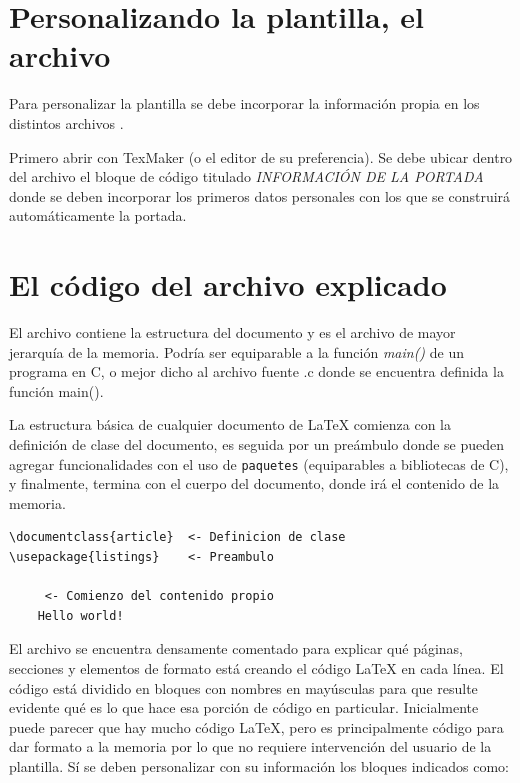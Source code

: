 \section{Personalizando la plantilla, el archivo }
\label{sec:FillingFile}

Para personalizar la plantilla se debe incorporar la información propia en los distintos archivos . 

Primero abrir  con TexMaker (o el editor de su preferencia). Se debe ubicar dentro del archivo el bloque de código titulado \emph{INFORMACIÓN DE LA PORTADA} donde se deben incorporar los primeros datos personales con los que se construirá automáticamente la portada.



\section{El código del archivo  explicado}

El archivo  contiene la estructura del documento y es el archivo de mayor jerarquía de la memoria.  Podría ser equiparable a la función \emph{main()} de un programa en C, o mejor dicho al archivo fuente .c donde se encuentra definida la función main().

La estructura básica de cualquier documento de \LaTeX{} comienza con la definición de clase del documento, es seguida por un preámbulo donde se pueden agregar funcionalidades con el uso de \texttt{paquetes} (equiparables a bibliotecas de C), y finalmente, termina con el cuerpo del documento, donde irá el contenido de la memoria.


\begin{lstlisting}
\documentclass{article}  <- Definicion de clase
\usepackage{listings}	 <- Preambulo

	 <- Comienzo del contenido propio 
	Hello world!

\end{lstlisting}


El archivo  se encuentra densamente comentado para explicar qué páginas, secciones y elementos de formato está creando el código \LaTeX{} en cada línea. El código está dividido en bloques con nombres en mayúsculas para que resulte evidente qué es lo que hace esa porción de código en particular. Inicialmente puede parecer que hay mucho código \LaTeX{}, pero es principalmente código para dar formato a la memoria por lo que no requiere intervención del usuario de la plantilla.  Sí se deben personalizar con su información los bloques indicados como:

